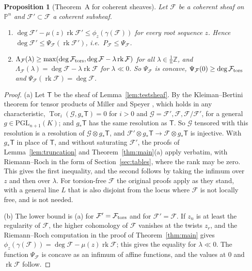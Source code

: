 \documentclass[11pt]{amsart}
\newtheorem{proposition}[theorem]{Proposition}
\theoremstyle{definition}
\theoremstyle{remark}
\newcommand{\PP}{\mathbb{P}}
\newcommand{\ZZ}{\mathbb{Z}}
\newcommand{\cF}{\mathcal{F}}
\newcommand{\Tt}{\mathsf{T}}
\DeclareMathOperator{\rk}{rk}
\begin{document}
\begin{proposition}[Theorem~A for coherent sheaves]\label{prop:cohA}
Let $\cF$ be a coherent sheaf on $\PP^n$ and $\cF'\subset\cF$ a coherent subsheaf.
\begin{enumerate}[label=\textup{(\alph*)}]
\item $\deg\cF'-\mu(z)\rk\cF'\le\phi_z(\gamma(\cF))$ for every root sequence $z$. Hence $\deg\cF'\le\Psi_\cF(\rk\cF')$, i.e.\ $P_\cF\le\Psi_\cF$.
\item $\Lambda_\cF(\lambda)\ge\max(\deg\cF_{\rm tors},\deg\cF-\lambda\rk\cF)$ for all $\lambda\in\frac1n\ZZ$, and $\Lambda_\cF(\lambda)=\deg\cF-\lambda\rk\cF$ for $\lambda\ll0$. So $\Psi_\cF$ is concave, $\Psi_\cF(0)\ge\deg\cF_{\rm tors}$ and $\Psi_\cF(\rk\cF)=\deg\cF$.
\end{enumerate}
\end{proposition}

\begin{proof}
(a) Let $\Tt$ be the sheaf of Lemma~\ref{lem:testsheaf}. By the Kleiman--Bertini theorem for tensor products of Miller and Speyer \cite{MiSp08}, which holds in any characteristic, $\operatorname{Tor}_i(\mathcal G,g_*\Tt)=0$ for $i>0$ and $\mathcal G=\cF',\cF,\cF/\cF'$, for a general $g\in\mathrm{PGL}_{n+1}(K)$; and $g_*\Tt$ has the same resolution as $\Tt$. So $\mathcal G$ tensored with this resolution is a resolution of $\mathcal G\otimes g_*\Tt$, and $\cF'\otimes g_*\Tt\to\cF\otimes g_*\Tt$ is injective. With $g_*\Tt$ in place of $\Tt$, and without saturating $\cF'$, the proofs of Lemma~\ref{lem:truncation} and Theorem~\ref{thm:main}(a) apply verbatim, with Riemann--Roch in the form of Section~\ref{sec:tables}, where the rank may be zero. This gives the first inequality, and the second follows by taking the infimum over $z$ and then over $\lambda$. For torsion-free $\cF$ the original proofs apply as they stand, with a general line $L$ that is also disjoint from the locus where $\cF$ is not locally free, and \cite{MiSp08} is not needed.

(b) The lower bound is (a) for $\cF'=\cF_{\rm tors}$ and for $\cF'=\cF$. If $z_n$ is at least the regularity of $\cF$, the higher cohomology of $\cF$ vanishes at the twists $z_r$, and the Riemann--Roch computation in the proof of Theorem~\ref{thm:main} gives $\phi_z(\gamma(\cF))=\deg\cF-\mu(z)\rk\cF$; this gives the equality for $\lambda\ll0$. The function $\Psi_\cF$ is concave as an infimum of affine functions, and the values at $0$ and $\rk\cF$ follow.
\end{proof}
\end{document}
